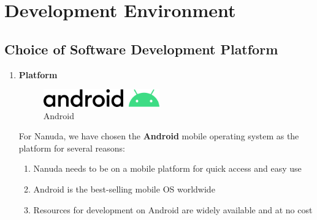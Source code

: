 \documentclass[conference]{IEEEtran}
\begin{document}
\section{Development Environment}
\subsection{Choice of Software Development Platform}
\begin{enumerate}
    \item \textbf{Platform}
        \newline
        \begin{figure}[htbp]
            \centerline{\includegraphics[width=50mm,scale=0.5]{img/logo-android.png}}
            \caption{Android}
            \label{fig:android-logo}
        \end{figure}
        \newline
        For Nanuda, we have chosen the \textbf{Android} mobile operating system as the platform for several reasons:
        \begin{enumerate}
            \item Nanuda needs to be on a mobile platform for quick access and easy use
            \item Android is the best-selling mobile OS worldwide
            \item Resources for development on Android are widely available and at no cost
        \end{enumerate}
        

\end{enumerate}
\end{document}
